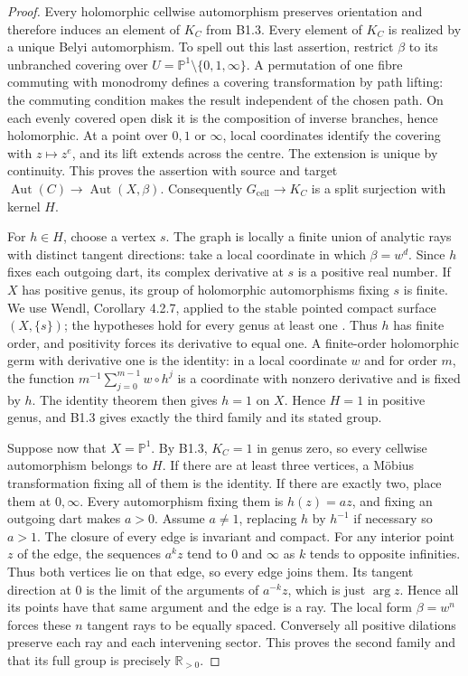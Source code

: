 \begin{proof}
Every holomorphic cellwise automorphism preserves orientation and
therefore induces an element of $K_C$ from B1.3. Every element of
$K_C$ is realized by a unique Belyi automorphism. To spell out this
last assertion, restrict $\beta$ to its unbranched covering over
$U=\mathbb P^1\setminus\{0,1,\infty\}$. A permutation of one fibre
commuting with monodromy defines a covering transformation by
path lifting: the commuting condition makes the result independent
of the chosen path. On each evenly covered open disk it is the
composition of inverse branches, hence holomorphic. At a point over
$0,1$ or $\infty$, local coordinates identify the covering with
$z\mapsto z^e$, and its lift extends across the centre. The extension
is unique by continuity. This proves the assertion with source and
target $\operatorname{Aut}(C)\longrightarrow\operatorname{Aut}(X,\beta)$.
Consequently
$G_{\mathrm{cell}}\longrightarrow K_C$ is a split surjection with
kernel $H$.

For $h\in H$, choose a vertex $s$. The graph is locally a finite
union of analytic rays with distinct tangent directions: take a
local coordinate in which $\beta=w^d$. Since $h$ fixes each outgoing
dart, its complex derivative at $s$ is a positive real number.
If $X$ has positive genus, its group of holomorphic automorphisms
fixing $s$ is finite. We use Wendl, Corollary 4.2.7, applied to the
stable pointed compact surface $(X,\{s\})$; the hypotheses hold for
every genus at least one \cite{Wendl2015B}. Thus $h$ has finite order,
and positivity forces its derivative to equal one. A finite-order
holomorphic germ with derivative one is the identity: in a local
coordinate $w$ and for order $m$, the function
$m^{-1}\sum_{j=0}^{m-1}w\circ h^j$ is a coordinate with nonzero
derivative and is fixed by $h$. The identity theorem then gives
$h=1$ on $X$. Hence $H=1$ in positive genus, and B1.3 gives exactly
the third family and its stated group.

Suppose now that $X=\mathbb P^1$. By B1.3, $K_C=1$ in genus zero,
so every cellwise automorphism belongs to $H$. If there are at least
three vertices, a M\"obius transformation fixing all of them is the
identity. If there are exactly two, place them at $0,\infty$.
Every automorphism fixing them is $h(z)=az$, and fixing an outgoing
dart makes $a>0$. Assume $a\ne1$, replacing $h$ by $h^{-1}$ if
necessary so $a>1$. The closure of every edge is invariant and
compact. For any interior point $z$ of the edge, the sequences
$a^kz$ tend to $0$ and $\infty$ as $k$ tends to opposite infinities.
Thus both vertices lie on that edge, so every edge joins them.
Its tangent direction at $0$ is the limit of the arguments of
$a^{-k}z$, which is just $\arg z$. Hence all its points have that
same argument and the edge is a ray. The local form $\beta=w^n$
forces these $n$ tangent rays to be equally spaced. Conversely all
positive dilations preserve each ray and each intervening sector.
This proves the second family and that its full group is precisely
$\mathbb R_{>0}$.


\end{proof}
